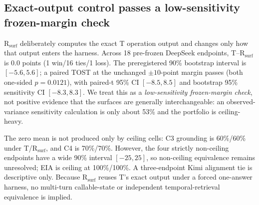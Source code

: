 \subsection{Exact-output control passes a low-sensitivity frozen-margin check}
R$_{\mathrm{surf}}$ deliberately computes the exact T operation output and changes only how that output enters the harness. Across 18 pre-frozen DeepSeek endpoints, T--R$_{\mathrm{surf}}$ is 0.0 points (1 win/16 ties/1 loss). The preregistered 90\% bootstrap interval is $[-5.6,5.6]$; a paired TOST at the unchanged $\pm10$-point margin passes (both one-sided $p=0.0121$), with paired-t 95\% CI $[-8.5,8.5]$ and bootstrap 95\% sensitivity CI $[-8.3,8.3]$. We treat this as a \emph{low-sensitivity frozen-margin check}, not positive evidence that the surfaces are generally interchangeable: an observed-variance sensitivity calculation is only about 53\% and the portfolio is ceiling-heavy.

The zero mean is not produced only by ceiling cells: C3 grounding is 60\%/60\% under T/R$_{\mathrm{surf}}$, and C4 is 70\%/70\%. However, the four strictly non-ceiling endpoints have a wide 90\% interval $[-25,25]$, so non-ceiling equivalence remains unresolved; EIA is ceiling at 100\%/100\%. A three-endpoint Kimi alignment tie is descriptive only. Because R$_{\mathrm{surf}}$ reuses T's exact output under a forced one-answer harness, no multi-turn callable-state or independent temporal-retrieval equivalence is implied.
